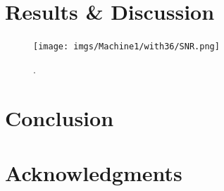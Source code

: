 \documentclass[10pt,twoside,twocolumn]{article}
\begin{document}
\section{Results \& Discussion}


\begin{figure}[!ht]
    \caption{.}
	\label{fig:img1}
	\begin{center}
		\texttt{[image: imgs/Machine1/with36/SNR.png]}
	\end{center}
\end{figure}




\section{Conclusion}


\section*{Acknowledgments}




\end{document}
